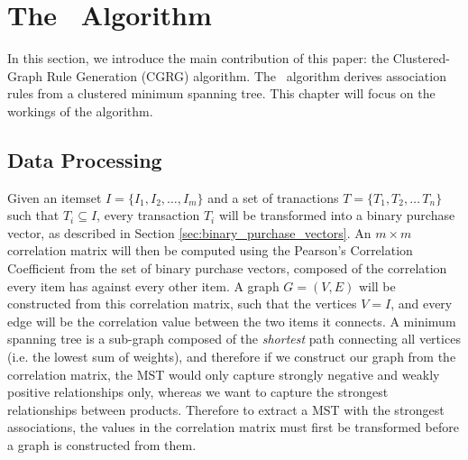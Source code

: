 
\chapter{The \algo\ Algorithm}
In this section, we introduce the main contribution of this paper: the Clustered-Graph Rule Generation (CGRG) algorithm. The \algo\ algorithm derives association rules from a clustered minimum spanning tree. This chapter will focus on the workings of the algorithm.

\section{Data Processing}
\label{sec:algo_data}
Given an itemset $I = \{I_1, I_2,\dots,I_m\}$ and a set of tranactions $T = \{T_1,T_2,\dots\,T_n\}$ such that $T_i \subseteq I$, every transaction $T_i$ will be transformed into a binary purchase vector, as described in Section \ref{sec:binary_purchase_vectors}. An $m \times m$ correlation matrix will then be computed using the Pearson's Correlation Coefficient from the set of binary purchase vectors, composed of the correlation every item has against every other item. A graph $G = (V,E)$ will be constructed from this correlation matrix, such that the vertices $V=I$, and every edge will be the correlation value between the two items it connects. A minimum spanning tree is a sub-graph composed of the \textit{shortest} path connecting all vertices (i.e. the lowest sum of weights), and therefore if we construct our graph from the correlation matrix, the MST would only capture strongly negative and weakly positive relationships only, whereas we want to capture the strongest relationships between products. Therefore to extract a MST with the strongest associations, the values in the correlation matrix must first be transformed before a graph is constructed from them.

